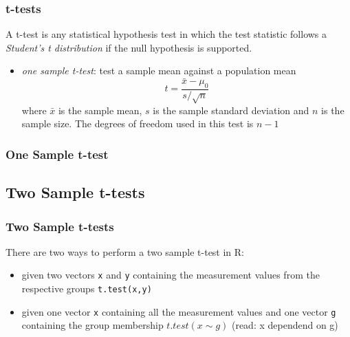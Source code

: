 \documentclass[xcolor={table}]{beamer}
\begin{document}

\begin{frame}[fragile]\frametitle{t-tests}
A t-test is any statistical hypothesis test in which the test statistic follows a \emph{Student's t distribution} if the null hypothesis is supported.
\begin{itemize}
\item \emph{one sample t-test}: test a sample mean against a population mean
$$ t = \frac{\bar{x}-\mu_0}{s/\sqrt{n}}$$ where $\bar{x}$ is the sample mean, $s$ is the sample standard deviation and $n$ is the sample size. The degrees of freedom used in this test is $n-1$
\end{itemize}
\end{frame}

\begin{frame}[fragile]\frametitle{One Sample t-test}
\end{frame}


\subsection{Two Sample t-tests}


\begin{frame}[fragile]\frametitle{Two Sample t-tests}
There are two ways to perform a two sample t-test in R:
\begin{itemize}
\item given two vectors \texttt{x} and \texttt{y} containing the measurement values from the respective groups \texttt{t.test(x,y)}
\item given one vector \texttt{x} containing all the measurement values and one vector \texttt{g} containing the group membership $t.test(x \sim g)$ (read: x dependend on g)
\end{itemize}
\end{frame}
\end{document}
